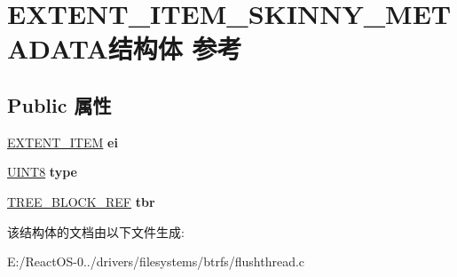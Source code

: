 \hypertarget{struct_e_x_t_e_n_t___i_t_e_m___s_k_i_n_n_y___m_e_t_a_d_a_t_a}{}\section{E\+X\+T\+E\+N\+T\+\_\+\+I\+T\+E\+M\+\_\+\+S\+K\+I\+N\+N\+Y\+\_\+\+M\+E\+T\+A\+D\+A\+T\+A结构体 参考}
\label{struct_e_x_t_e_n_t___i_t_e_m___s_k_i_n_n_y___m_e_t_a_d_a_t_a}
\subsection*{Public 属性}
\begin{DoxyCompactItemize}
\item 
\mbox{\label{struct_e_x_t_e_n_t___i_t_e_m___s_k_i_n_n_y___m_e_t_a_d_a_t_a_a09e35a4b20de8d88fc02556f9dabd278}} 
\hyperlink{struct_e_x_t_e_n_t___i_t_e_m}{E\+X\+T\+E\+N\+T\+\_\+\+I\+T\+EM} {\bfseries ei}
\item 
\mbox{\label{struct_e_x_t_e_n_t___i_t_e_m___s_k_i_n_n_y___m_e_t_a_d_a_t_a_a89613f72eeae0b06b01c752a9a9beba6}} 
\hyperlink{_processor_bind_8h_ab27e9918b538ce9d8ca692479b375b6a}{U\+I\+N\+T8} {\bfseries type}
\item 
\mbox{\label{struct_e_x_t_e_n_t___i_t_e_m___s_k_i_n_n_y___m_e_t_a_d_a_t_a_a141d18531c86af8451b447cc77302bdf}} 
\hyperlink{struct_t_r_e_e___b_l_o_c_k___r_e_f}{T\+R\+E\+E\+\_\+\+B\+L\+O\+C\+K\+\_\+\+R\+EF} {\bfseries tbr}
\end{DoxyCompactItemize}


该结构体的文档由以下文件生成\+:\begin{DoxyCompactItemize}
\item 
E\+:/\+React\+O\+S-\/0../drivers/filesystems/btrfs/flushthread.\+c\end{DoxyCompactItemize}
